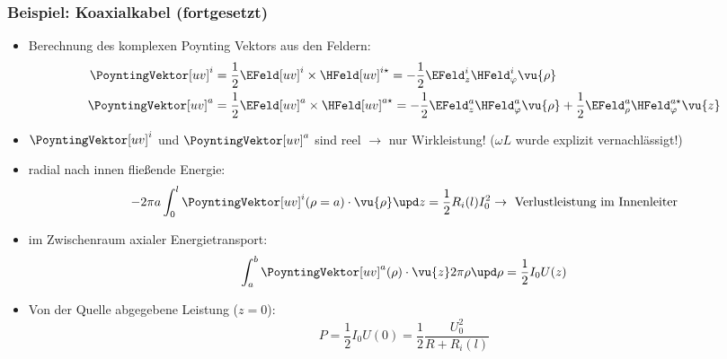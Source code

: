 \begin{frame}
  \frametitle{Beispiel: Koaxialkabel (fortgesetzt)}
\begin{itemize}[<+->]
\item Berechnung des komplexen Poynting Vektors aus den Feldern:
  \begin{align*}
    \PoyntingVektor[uv]^i &= \frac{1}{2} \EFeld[uv]^i \times \HFeld[uv]^{i\star} = -\frac{1}{2} \EFeld_z^i \HFeld_\varphi^i \vu{\rho}\\
    \PoyntingVektor[uv]^a &=\frac{1}{2} \EFeld[uv]^a \times \HFeld[uv]^{a\star} = -\frac{1}{2} \EFeld_z^a \HFeld_\varphi^a \vu{\rho} + \frac{1}{2} \EFeld_\rho^a \HFeld_\varphi^{a\star} \vu{z}
  \end{align*}
\item $\PoyntingVektor[uv]^i$ und $\PoyntingVektor[uv]^a$ sind reel $\to$ nur Wirkleistung! ($\omega L$ wurde explizit vernachlässigt!)
\item radial nach innen fließende Energie:
  $$
  - 2\pi a \int_0^l \PoyntingVektor[uv]^i (\rho=a)\cdot\vu{\rho} \upd z = \frac{1}{2} R_i(l) I_0^2 \to \text{ Verlustleistung im Innenleiter}
  $$
\item im Zwischenraum axialer Energietransport:
  $$
  \int_a^b \PoyntingVektor[uv]^a (\rho) \cdot\vu{z} 2 \pi\rho\upd\rho = \frac{1}{2} I_0 U(z) 
  $$
\item Von der Quelle abgegebene Leistung ($z=0$):
  $$
  P = \frac{1}{2} I_0U(0) = \frac{1}{2} \frac{U_0^2}{R+R_i(l)}
  $$
  \end{itemize}
\end{frame}




   

